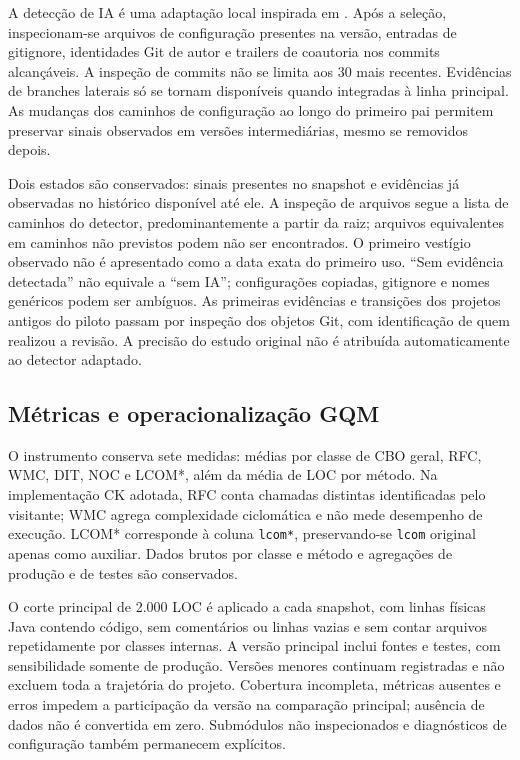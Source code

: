 A detecção de IA é uma adaptação local inspirada em \cite{robbes:26}. Após a seleção, inspecionam-se arquivos de configuração presentes na versão, entradas de gitignore, identidades Git de autor e trailers de coautoria nos commits alcançáveis. A inspeção de commits não se limita aos 30 mais recentes. Evidências de branches laterais só se tornam disponíveis quando integradas à linha principal. As mudanças dos caminhos de configuração ao longo do primeiro pai permitem preservar sinais observados em versões intermediárias, mesmo se removidos depois.

Dois estados são conservados: sinais presentes no snapshot e evidências já observadas no histórico disponível até ele. A inspeção de arquivos segue a lista de caminhos do detector, predominantemente a partir da raiz; arquivos equivalentes em caminhos não previstos podem não ser encontrados. O primeiro vestígio observado não é apresentado como a data exata do primeiro uso. ``Sem evidência detectada'' não equivale a ``sem IA''; configurações copiadas, gitignore e nomes genéricos podem ser ambíguos. As primeiras evidências e transições dos projetos antigos do piloto passam por inspeção dos objetos Git, com identificação de quem realizou a revisão. A precisão do estudo original não é atribuída automaticamente ao detector adaptado.

\subsection{Métricas e operacionalização GQM}
\label{subsec:metricas-avaliacao}

O instrumento conserva sete medidas: médias por classe de CBO geral, RFC, WMC, DIT, NOC e LCOM*, além da média de LOC por método. Na implementação CK adotada, RFC conta chamadas distintas identificadas pelo visitante; WMC agrega complexidade ciclomática e não mede desempenho de execução. LCOM* corresponde à coluna \texttt{lcom*}, preservando-se \texttt{lcom} original apenas como auxiliar. Dados brutos por classe e método e agregações de produção e de testes são conservados.

O corte principal de 2.000 LOC é aplicado a cada snapshot, com linhas físicas Java contendo código, sem comentários ou linhas vazias e sem contar arquivos repetidamente por classes internas. A versão principal inclui fontes e testes, com sensibilidade somente de produção. Versões menores continuam registradas e não excluem toda a trajetória do projeto. Cobertura incompleta, métricas ausentes e erros impedem a participação da versão na comparação principal; ausência de dados não é convertida em zero. Submódulos não inspecionados e diagnósticos de configuração também permanecem explícitos.


